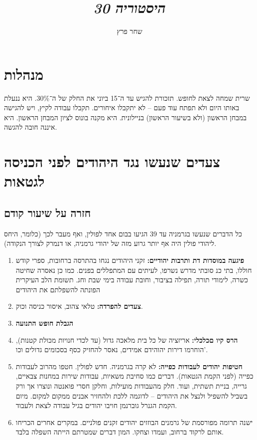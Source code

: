 \documentclass[]{article}
\author{שחר פרץ}
\title{\textit{היסטוריה 30}}
\begin{document}
    \maketitle
    \section{מנהלות}
    שרית שמחה לצאת לחופש. תזכורת להגיש עד ה־15 ביוני את החלק של ה־30\%. היא ננעלת באותו היום ולא תפתח עוד פעם – לא יתקבלו איחורים. תקבלו עבודה לקיץ, ויש להגישה במבחן הראשון (ולא בשיעור הראשון) בניילונית. היא מקנה בונוס לציון המבחן הראשון. היא איננה חובה להגשה. 
    
    \section{צעדים שנעשו נגד היהודים לפני הכניסה לגטאות}
    \subsection{חזרה על שיעור קודם}
    כל הדברים שנעשו בגרמניה עד 39 הגיעו בבום אחד לפולין, ואף מעבר לכך (כלומר, היחס ליהודי פולין היה אף יותר גרוע מזה של יהודי גרמניה, או דנמרק לצורך הנקודה). 
    \begin{enumerate}
        \item \textbf{פיגעה במוסדות דת ותרבות יהודיים: }זקני היהודים נגחו בהתרסה ברחובות, ספרי קודש חוללו, בתי כנ סובתי מדרש נשרפו, לעיתים עם המתפללים בפנים. כמו כן נאסרה שחיטה כשרה, לימודי תורה, תפילה בציבור, וחובת עבודה בימי שבת וחג. תשומת הלב העיקרית הפונתה להשפלתם את היהודים
        \item \textbf{צעדים להפרדה: }טלאי צהוב, איסור כניסה וכוק. 
        \item \textbf{הגבלת חופש התנועה}
        \item \textbf{הרס קיו םכלכלי: }אריזציה של כל בית מלאכה גדול (עד לכדי חנויות מכולת קטנות), הוחרמו דירות יהוהידם אמידים, נאסר להחזיק כסף בסכומים גדולים וכו'. 
        \item \textbf{חטיפות יהודים לעבודות כפייה: }לא קרה בגרמניה. חדש לפולין. חטפו מהרוב לעבודות כפייה (לפני הקמת הגטאות). דברים כמו סחיבת משאיות, עבודות שירות במחנות צבאיים, גרייה, בניית תשתית, ועוד. חלק מהעבודות מועילות, וחלקן חסרי פואנטה ונוצרו אך ורק בשביל להשפיל ולנצל את היהודים – לדוגמה ללכת ולהחזיר אבנים ממקום למקום. מיום הקמת הגנרל גוברנמן חויבו יהודים בגיל עבודה לצאת ולעבוד. 
        \item ישנה תרומה מפורסמת של גרמנים הבוזזים יהודים זקנים פולניים. במקרים אחרים הכריחו אותם לרקוד ברחוב, ועמדו וצחקו. המון דברים שמטרתם הייתה השפלה בלבד. 
    \end{enumerate}
    
\end{document}
